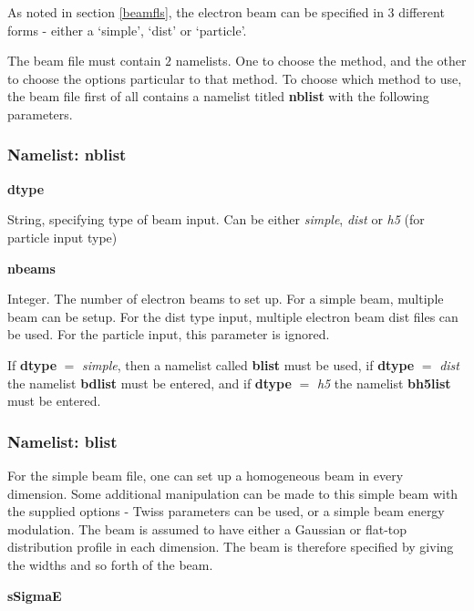 \documentclass[12pt]{article}%
\begin{document}
As noted in section \ref{beamfls}, the electron beam can be specified in 3 different forms - either a `simple', `dist' or `particle'.

The beam file must contain $2$ namelists. One to choose the method, and the other to choose the options particular to that method. To choose which method to use, the beam file first of all contains a namelist titled {\bf nblist} with the following parameters.

\subsubsection{Namelist: nblist}

{\bf dtype}

String, specifying type of beam input. Can be either {\it simple}, {\it dist} or {\it h5} (for particle input type)

{\bf nbeams}

Integer. The number of electron beams to set up. For a simple beam, multiple beam can be setup. For the dist type input, multiple electron beam dist files can be used. For the particle input, this parameter is ignored.

If {\bf dtype} $=$ {\it simple}, then a namelist called {\bf blist} must be used, if {\bf dtype} $=$ {\it dist} the namelist {\bf bdlist} must be entered, and if {\bf dtype} $=$ {\it h5} the namelist {\bf bh5list} must be entered.

\subsubsection{Namelist: blist}

For the simple beam file, one can set up a homogeneous beam in every dimension. Some additional manipulation can be made to this simple beam with the supplied options - Twiss parameters can be used, or a simple beam energy modulation. The beam is assumed to have either a Gaussian or flat-top distribution profile in each dimension. The beam is therefore specified by giving the widths and so forth of the beam.

{\bf sSigmaE}





%
\end{document}

